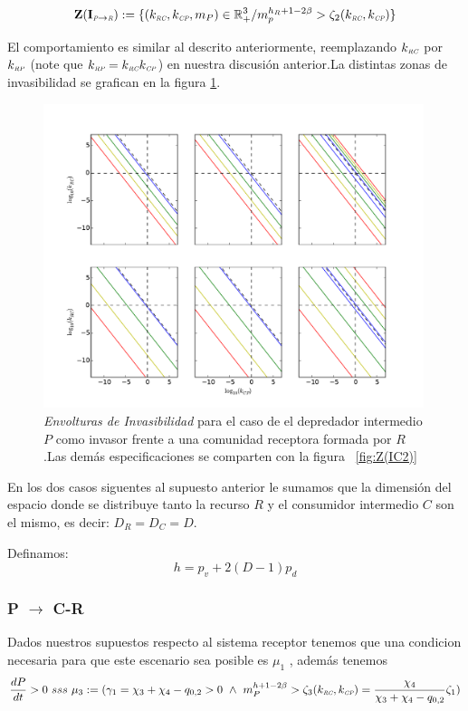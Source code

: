 \begin{equation}
\mathbf{Z(I_{\textit{\tiny P} \to \textit{\tiny R}})} := \{ (k_{\textit{\tiny RC}},k_{\textit{\tiny CP}},m_P) \in \mathbb{R}^3_+ / m_p^{h_R + 1 - 2\beta} > \zeta_2(k_{\textit{\tiny RC}},k_{\textit{\tiny CP}}) \}
\end{equation}

El comportamiento es similar al descrito anteriormente, reemplazando $k_{\textit{\tiny RC}}$ por $k_{\textit{\tiny RP}}$ (note que $k_{\textit{\tiny RP}} = k_{\textit{\tiny RC}} k_{\textit{\tiny CP}}$) en nuestra discusi\'on anterior.La distintas zonas de invasibilidad se grafican en la figura \ref{fig:Z(IC3)}.


\begin{figure}
  \centering
  \includegraphics[width = 0.99\textwidth]{./Plots/Z(IC3)AcGrGr.pdf}
  \caption[Env $Z(IC2)$]{\emph{Envolturas de Invasibilidad} para el caso de el depredador intermedio $P$ como invasor frente a una comunidad receptora formada por $R$.Las dem\'as especificaciones se comparten con la figura ~\ref{fig:Z(IC2)}}
  \label{fig:Z(IC3)}
\end{figure}

En los dos casos siguentes al supuesto anterior le sumamos que la dimensi\'on del espacio donde se distribuye tanto la recurso $R$ y el consumidor intermedio $C$ son el mismo, es decir: $D_R = D_C = D$.

Definamos:
\begin{equation}
  h = p_v + 2(D-1)p_d
\end{equation}

\subsubsection{P $\to$ C-R}
Dados nuestros supuestos respecto al sistema receptor tenemos que una condicion necesaria para que este escenario sea posible es $\mu_1$ , adem\'as tenemos
\begin{equation}
  \frac{dP}{dt}  >0 \ sss \  \mu_3 := (\gamma_1 = \chi_3 + \chi_4 - q_{0,2} >0 \ \land \ m_P^{h + 1 - 2\beta} > \zeta_3(k_{\textit{\tiny RC}},k_{\textit{\tiny CP}}) = \frac{\chi_4}{\chi_3 + \chi_4 - q_{0,2}}\zeta_1)
\end{equation}


